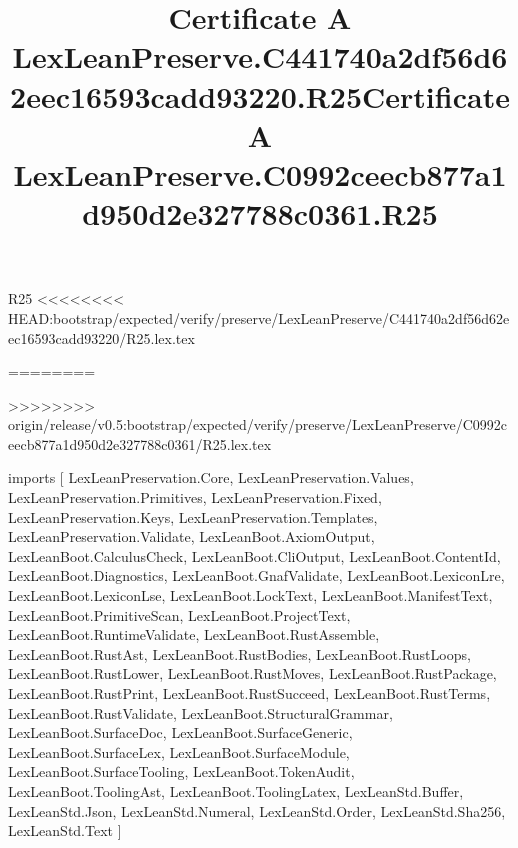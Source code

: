 \begin{lexlean}{R25}
<<<<<<<< HEAD:bootstrap/expected/verify/preserve/LexLeanPreserve/C441740a2df56d62eec16593cadd93220/R25.lex.tex
\title{Certificate A LexLeanPreserve.C441740a2df56d62eec16593cadd93220.R25}
========
\title{Certificate A LexLeanPreserve.C0992ceecb877a1d950d2e327788c0361.R25}
>>>>>>>> origin/release/v0.5:bootstrap/expected/verify/preserve/LexLeanPreserve/C0992ceecb877a1d950d2e327788c0361/R25.lex.tex
\begin{coremodule}
imports [
  LexLeanPreservation.Core,
  LexLeanPreservation.Values,
  LexLeanPreservation.Primitives,
  LexLeanPreservation.Fixed,
  LexLeanPreservation.Keys,
  LexLeanPreservation.Templates,
  LexLeanPreservation.Validate,
  LexLeanBoot.AxiomOutput,
  LexLeanBoot.CalculusCheck,
  LexLeanBoot.CliOutput,
  LexLeanBoot.ContentId,
  LexLeanBoot.Diagnostics,
  LexLeanBoot.GnafValidate,
  LexLeanBoot.LexiconLre,
  LexLeanBoot.LexiconLse,
  LexLeanBoot.LockText,
  LexLeanBoot.ManifestText,
  LexLeanBoot.PrimitiveScan,
  LexLeanBoot.ProjectText,
  LexLeanBoot.RuntimeValidate,
  LexLeanBoot.RustAssemble,
  LexLeanBoot.RustAst,
  LexLeanBoot.RustBodies,
  LexLeanBoot.RustLoops,
  LexLeanBoot.RustLower,
  LexLeanBoot.RustMoves,
  LexLeanBoot.RustPackage,
  LexLeanBoot.RustPrint,
  LexLeanBoot.RustSucceed,
  LexLeanBoot.RustTerms,
  LexLeanBoot.RustValidate,
  LexLeanBoot.StructuralGrammar,
  LexLeanBoot.SurfaceDoc,
  LexLeanBoot.SurfaceGeneric,
  LexLeanBoot.SurfaceLex,
  LexLeanBoot.SurfaceModule,
  LexLeanBoot.SurfaceTooling,
  LexLeanBoot.TokenAudit,
  LexLeanBoot.ToolingAst,
  LexLeanBoot.ToolingLatex,
  LexLeanStd.Buffer,
  LexLeanStd.Json,
  LexLeanStd.Numeral,
  LexLeanStd.Order,
  LexLeanStd.Sha256,
  LexLeanStd.Text
]


\end{coremodule}
\end{lexlean}
